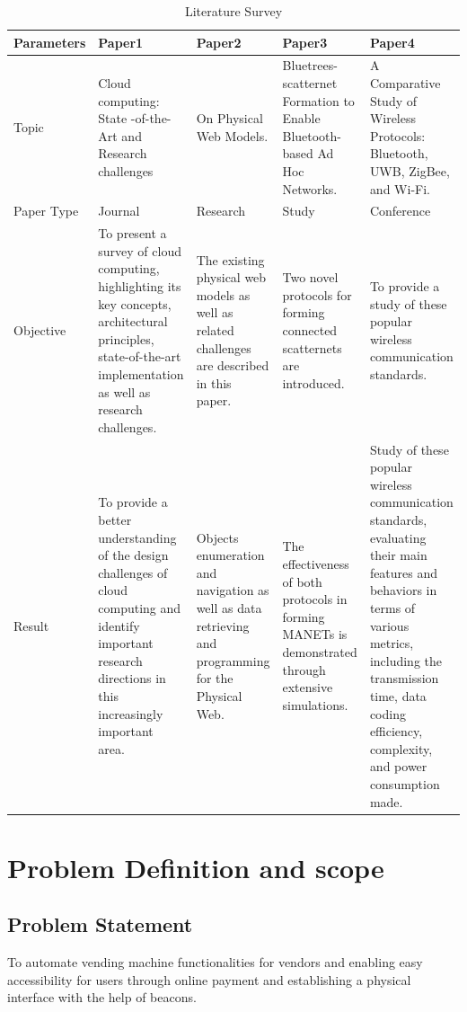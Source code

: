 \documentclass[oneside,a4paper,12pt]{report}
\begin{document}
\begin{table}[!htbp]
\begin{center}
\def\arraystretch{1.5}
\begin{tabularx}{\textwidth}{| X | X | X | X | X |}
\hline
Parameters	&Paper1 &Paper2 &Paper3 &Paper4\\
\hline
Topic       &Cloud computing: State -of-the-Art and Research challenges &On Physical Web Models. &Bluetrees-scatternet Formation to Enable Bluetooth-based Ad Hoc Networks. &A Comparative Study of Wireless Protocols: Bluetooth, UWB, ZigBee, and Wi-Fi.\\
\hline

Paper Type      &Journal &Research  &Study  &Conference\\
\hline

Objective      & To present a survey of cloud computing, highlighting its key concepts, architectural principles, state-of-the-art implementation as well as research challenges.& The existing physical web models as well as related challenges are described in this paper. &Two novel protocols for forming connected scatternets are introduced. &To provide a study of these popular wireless communication standards.\\
\hline

Result &To provide a better understanding of the design challenges of cloud computing and identify important research directions in this increasingly important area. &Objects enumeration and navigation as well as data retrieving and programming for the Physical Web. &The effectiveness of both protocols in forming MANETs is demonstrated
through extensive simulations. &Study of these popular wireless communication standards, evaluating their main features and behaviors in terms of various metrics, including the transmission time, data coding efficiency, complexity, and power consumption made.\\
\hline


\end{tabularx}
\end{center}
\caption{Literature Survey}
\label{tab:usecase}
\end{table}



\chapter{Problem Definition and scope}
\section{Problem Statement}
 To automate vending machine functionalities for vendors and enabling easy accessibility for users through online payment and establishing a physical interface with the help of beacons. 
\end{document}
